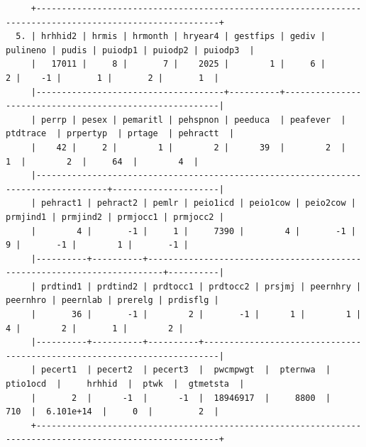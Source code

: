 \documentclass[
]{book}
\begin{document}
\begin{verbatim}
     +----------------------------------------------------------------------------------------------------------+
  5. | hrhhid2 | hrmis | hrmonth | hryear4 | gestfips | gediv | pulineno | pudis | puiodp1 | puiodp2 | puiodp3  |
     |   17011 |     8 |       7 |    2025 |        1 |     6 |        2 |    -1 |       1 |       2 |       1  |
     |-------------------------------------+----------+---------------------------------------------------------|
     | perrp | pesex | pemaritl | pehspnon | peeduca  | peafever  | ptdtrace  | prpertyp  | prtage  | pehractt  |
     |    42 |     2 |        1 |        2 |      39  |        2  |        1  |        2  |     64  |        4  |
     |------------------------------------------------------------------------------------+---------------------|
     | pehract1 | pehract2 | pemlr | peio1icd | peio1cow | peio2cow | prmjind1 | prmjind2 | prmjocc1 | prmjocc2 |
     |        4 |       -1 |     1 |     7390 |        4 |       -1 |        9 |       -1 |        1 |       -1 |
     |----------+----------+-------------------------------------------------------------------------+----------|
     | prdtind1 | prdtind2 | prdtocc1 | prdtocc2 | prsjmj | peernhry | peernhro | peernlab | prerelg | prdisflg |
     |       36 |       -1 |        2 |       -1 |      1 |        1 |        4 |        2 |       1 |        2 |
     |----------+----------+----------+-------------------------------------------------------------------------|
     | pecert1  | pecert2  | pecert3  |  pwcmpwgt  |  pternwa  |  ptio1ocd  |     hrhhid  |  ptwk  |  gtmetsta  |
     |       2  |      -1  |      -1  |  18946917  |     8800  |       710  |  6.101e+14  |     0  |         2  |
     +----------------------------------------------------------------------------------------------------------+


\end{verbatim}
\end{document}
